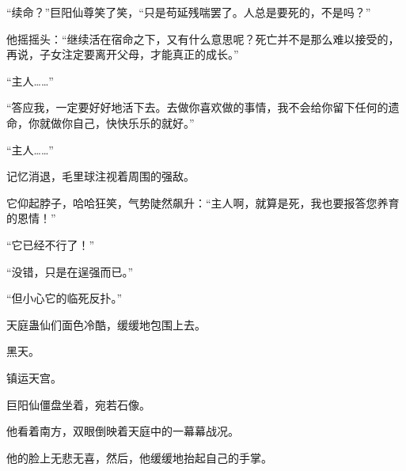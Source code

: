 \begin{this_body}
“续命？”巨阳仙尊笑了笑，“只是苟延残喘罢了。人总是要死的，不是吗？”

他摇摇头：“继续活在宿命之下，又有什么意思呢？死亡并不是那么难以接受的，再说，子女注定要离开父母，才能真正的成长。”

“主人……”

“答应我，一定要好好地活下去。去做你喜欢做的事情，我不会给你留下任何的遗命，你就做你自己，快快乐乐的就好。”

“主人……”

记忆消退，毛里球注视着周围的强敌。

它仰起脖子，哈哈狂笑，气势陡然飙升：“主人啊，就算是死，我也要报答您养育的恩情！”

“它已经不行了！”

“没错，只是在逞强而已。”

“但小心它的临死反扑。”

天庭蛊仙们面色冷酷，缓缓地包围上去。

黑天。

镇运天宫。

巨阳仙僵盘坐着，宛若石像。

他看着南方，双眼倒映着天庭中的一幕幕战况。

他的脸上无悲无喜，然后，他缓缓地抬起自己的手掌。

\end{this_body}

